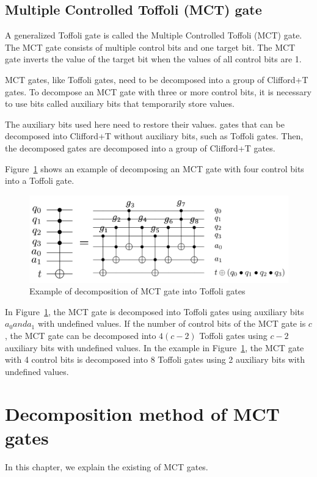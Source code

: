 \subsection{Multiple Controlled Toffoli (MCT) gate}

A generalized Toffoli gate is called the Multiple Controlled Toffoli (MCT) gate\cite{barenco1995elementary}.
The MCT gate consists of multiple control bits and one target bit.
The MCT gate inverts the value of the target bit when the values of all control bits are 1.

MCT gates, like Toffoli gates, need to be decomposed into a group of Clifford+T gates.
To decompose an MCT gate with three or more control bits,
it is necessary to use bits called auxiliary bits that temporarily store values.

The auxiliary bits used here need to restore their values.
gates that can be decomposed into Clifford+T without auxiliary bits,
such as Toffoli gates. 
Then, the decomposed gates are decomposed into a group of Clifford+T gates.
\par
Figure~\ref{barenco} shows an example of decomposing an MCT gate with four control bits into a Toffoli gate.
\begin{figure}[tbp]
\centering
\includegraphics[width=0.95\linewidth]{img/barenco.pdf}
\caption{Example of decomposition of MCT gate into Toffoli gates}
\label{barenco}
\end{figure}
In Figure~\ref{barenco}, the MCT gate is decomposed into Toffoli gates using auxiliary bits $a_{0} and a_{1}$ with undefined values.
If the number of control bits of the MCT gate is $c$, the MCT gate can be decomposed into $4(c-2)$ Toffoli gates using $c-2$ auxiliary bits with undefined values\cite{barenco1995elementary}.
In the example in Figure~\ref{barenco}, the MCT gate with 4 control bits is decomposed into 8 Toffoli gates using 2 auxiliary bits with undefined values.

\section{Decomposition method of MCT gates}
In this chapter, we explain the existing  of MCT gates.

